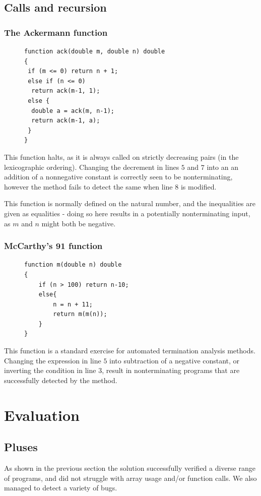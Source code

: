 \documentclass[12pt,a4paper]{article}
\begin{document}
\subsection{Calls and recursion}
\subsubsection{The Ackermann function}\label{example:ack}
\begin{figure}
\centering
\begin{lstlisting}[frame=tlrb,language=myLang]
function ack(double m, double n) double
{
 if (m <= 0) return n + 1;
 else if (n <= 0) 
  return ack(m-1, 1);
 else {
  double a = ack(m, n-1);
  return ack(m-1, a);
 }
}
\end{lstlisting}
\end{figure}
This function halts, as it is always called on strictly decreasing pairs (in the lexicographic ordering).
Changing the decrement in lines $5$ and $7$ into an an addition of a nonnegative constant is correctly seen to be nonterminating,
however the method fails to detect the same when line $8$ is modified.

This function is normally defined on the natural number, and the inequalities are given as equalities - doing so here results in a potentially
nonterminating input, as $m$ and $n$ might both be negative.

\subsubsection{McCarthy's 91 function}
\begin{figure}
\centering
\begin{lstlisting}[frame=tlrb,language=myLang]
function m(double n) double
{
    if (n > 100) return n-10;
    else{
        n = n + 11;
        return m(m(n));
    }
}
\end{lstlisting}
\end{figure}
This function is a standard exercise for automated termination analysis methods. Changing the expression in line $5$ into subtraction of a negative constant,
or inverting the condition in line $3$, result in nonterminating programs that are successfully detected by the method.
\pagebreak
\section{Evaluation}
\subsection{Pluses}
As shown in the previous section the solution successfully verified a diverse range of programs, and did not struggle with array usage and/or function calls.
We also managed to detect a variety of bugs.
\end{document}
